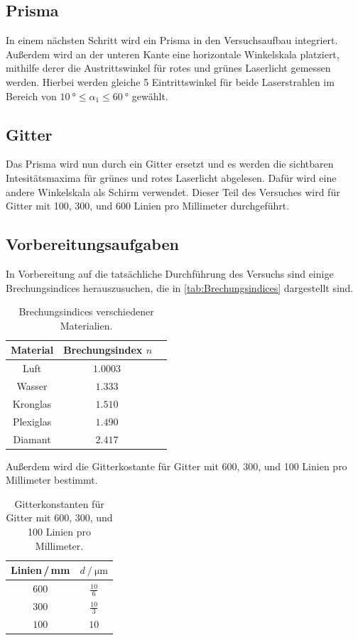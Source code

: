 \subsection{Prisma}
In einem nächsten Schritt wird ein Prisma in den Versuchsaufbau integriert. Außerdem wird an der unteren Kante eine 
horizontale Winkelskala platziert, mithilfe derer die Austrittswinkel für rotes und grünes Laserlicht gemessen werden.
Hierbei werden gleiche 5 Eintrittswinkel für beide Laserstrahlen im Bereich von $\qty{10}{\degree} ≤ \alpha_1 ≤ \qty{60}{\degree}$
gewählt.

\subsection{Gitter}
Das Prisma wird nun durch ein Gitter ersetzt und es werden die sichtbaren Intesitätsmaxima für grünes und rotes Laserlicht
abgelesen. Dafür wird eine andere Winkelskala als Schirm verwendet. Dieser Teil des Versuches wird für Gitter mit 100, 300, und
600 Linien pro Millimeter durchgeführt.

\subsection{Vorbereitungsaufgaben}
In Vorbereitung auf die tatsächliche Durchführung des Versuchs sind einige Brechungsindices herauszusuchen, die in 
\autoref{tab:Brechungsindices} dargestellt sind.
\begin{table}[H]
    \centering
    \caption{Brechungsindices verschiedener Materialien.}
    \label{tab:Brechungsindices}
    \begin{tabular}{S S S}
        \toprule
        {Material} & {Brechungsindex $n$} \\
        \midrule
        {Luft}      & {$\num{1,0003}$\,\cite{Brechungsindex_Wien}} \\ 
        {Wasser}    & {$\num{1,333}$\,\cite{Brechungsindex_Wien}} \\  
        {Kronglas}  & {$\num{1,510}$\,\cite{Brechungsindex}} \\ 
        {Plexiglas} & {$\num{1,490}$\,\cite{Brechungsindex}} \\ 
        {Diamant}   & {$\num{2,417}$\,\cite{Brechungsindex_Wien}} \\ 
        \bottomrule
    \end{tabular}
  \end{table}
  Außerdem wird die Gitterkostante für Gitter mit 600, 300, und 100 Linien pro Millimeter bestimmt.
  \begin{table}[H]
    \centering
    \caption{Gitterkonstanten für Gitter mit 600, 300, und 100 Linien pro Millimeter.}
    \label{tab:Gitter}
    \begin{tabular}{S S}
        \toprule
        {Linien\,/\,mm} & {$d \mathbin{/} \unit{\micro\metre}$} \\
        \midrule
        $\num{600}$ & $\frac{10}{6}$ \\
        $\num{300}$ & $\frac{10}{3}$ \\
        $\num{100}$ & $\num{10}$     \\ 
        \bottomrule
    \end{tabular}
  \end{table}